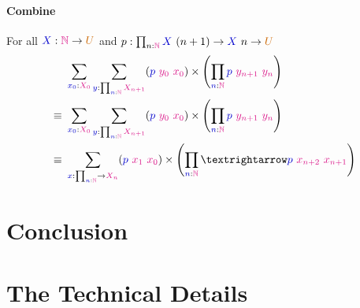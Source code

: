 \documentclass[twoside,11pt,openright]{report}
\newcommand*{\term}[1]{\textcolor{blue!80!black}{#1}}
\newcommand*{\type}[1]{\textcolor{magenta!90!black}{#1}}
\newcommand*{\universe}[1]{\textcolor{orange!80!black}{#1}}
\begin{document}
\subsubsection{Combine}
For all \(\term{X} : \type{\mathbb{N}} \rightarrow \universe{U}\) and \(p : \prod_{n : \type{\mathbb{N}}} \term{X}~(n + 1) \rightarrow \term{X}~n \rightarrow \universe{U}\)
\begin{align}
  &~\sum_{\term{x_0} : \type{X_0}} \sum_{\term{y} : \prod_{\term{n} : \type{\mathbb{N}}} \type{X_{n+1}}} (\term{p}~\type{y_0}~\type{x_0}) \times \left(\prod_{\term{n} : \type{\mathbb{N}}} \term{p}~\type{y_{n + 1}}~\type{y_n}\right) \\
  \equiv&~\sum_{\term{x_0} : \type{X_0}} \sum_{\term{y} : \prod_{\term{n} : \type{\mathbb{N}}} \type{X_{n+1}}} (\term{p}~\type{y_0}~\type{x_0}) \times \left(\prod_{\term{n} : \type{\mathbb{N}}} \term{p}~\type{y_{n + 1}}~\type{y_n}\right) \\
  \equiv&~\sum_{\term{x} : \prod_{\term{n} : \type{\mathbb{N}}} \rightarrow \type{X_n}} (\term{p}~\type{x_1}~\type{x_0}) \times \left(\prod_{\term{n} : \type{\mathbb{N}}} → \term{p}~\type{x_{n+2}}~\type{x_{n+1}}\right)
\end{align}

\chapter{Conclusion}
\label{ch:conclusion}



\cleardoublepage
{}
 



\cleardoublepage
\appendix
\chapter{The Technical Details}

\todo[inline]{\dots}
\end{document}
